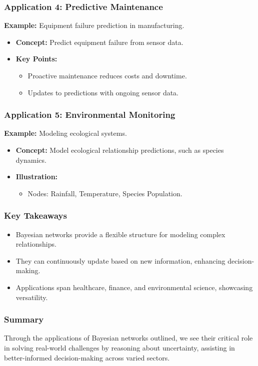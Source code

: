 \documentclass[aspectratio=169]{beamer}
\begin{document}
\begin{frame}[fragile]
    \frametitle{Application 4: Predictive Maintenance}
    \textbf{Example:} Equipment failure prediction in manufacturing.
    \begin{itemize}
        \item \textbf{Concept:} Predict equipment failure from sensor data.
        \item \textbf{Key Points:}
        \begin{itemize}
            \item Proactive maintenance reduces costs and downtime.
            \item Updates to predictions with ongoing sensor data.
        \end{itemize}
    \end{itemize}
\end{frame}

\begin{frame}[fragile]
    \frametitle{Application 5: Environmental Monitoring}
    \textbf{Example:} Modeling ecological systems.
    \begin{itemize}
        \item \textbf{Concept:} Model ecological relationship predictions, such as species dynamics.
        \item \textbf{Illustration:}
        \begin{itemize}
            \item Nodes: Rainfall, Temperature, Species Population.
        \end{itemize}
    \end{itemize}
\end{frame}

\begin{frame}[fragile]
    \frametitle{Key Takeaways}
    \begin{itemize}
        \item Bayesian networks provide a flexible structure for modeling complex relationships.
        \item They can continuously update based on new information, enhancing decision-making.
        \item Applications span healthcare, finance, and environmental science, showcasing versatility.
    \end{itemize}
\end{frame}

\begin{frame}[fragile]
    \frametitle{Summary}
    Through the applications of Bayesian networks outlined, we see their critical role in solving real-world challenges by reasoning about uncertainty, assisting in better-informed decision-making across varied sectors.
\end{frame}
\end{document}
